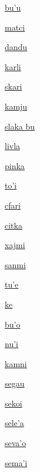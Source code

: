{\hyperlink{val:buhu}{bu'u}}{}{}{}

{\hyperlink{val:matci}{matci}}{}{}{}

{\hyperlink{val:dandu}{dandu}}{}{}{}

{\hyperlink{val:karli}{karli}}{}{}{}

{\hyperlink{val:skari}{skari}}{}{}{}

{\hyperlink{val:kamju}{kamju}}{}{}{}

{\hyperlink{val:slaka bu}{slaka bu}}{}{}{}

{\hyperlink{val:livla}{livla}}{}{}{}

{\hyperlink{val:pinka}{pinka}}{}{}{}

{\hyperlink{val:tohi}{to'i}}{}{}{}

{\hyperlink{val:cfari}{cfari}}{}{}{}

{\hyperlink{val:citka}{citka}}{}{}{}

{\hyperlink{val:xajmi}{xajmi}}{}{}{}

{\hyperlink{val:sanmi}{sanmi}}{}{}{}

{\hyperlink{val:tuhe}{tu'e}}{}{}{}

{\hyperlink{val:ke}{ke}}{}{}{}

{\hyperlink{val:buho}{bu'o}}{}{}{}

{\hyperlink{val:nuhi}{nu'i}}{}{}{}

{\hyperlink{val:kamni}{kamni}}{}{}{}

{\hyperlink{val:segau}{segau}}{}{}{}

{\hyperlink{val:sekoi}{sekoi}}{}{}{}

{\hyperlink{val:seleha}{sele'a}}{}{}{}

{\hyperlink{val:sevaho}{seva'o}}{}{}{}

{\hyperlink{val:semahi}{sema'i}}{}{}{}

